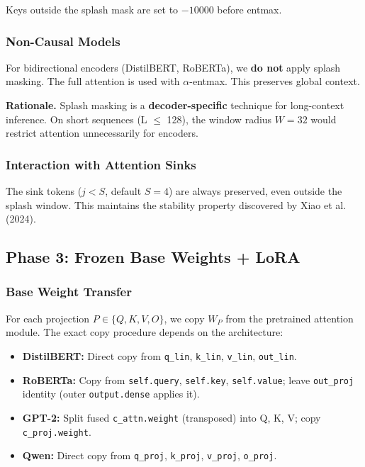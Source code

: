 Keys outside the splash mask are set to $-10000$ before entmax.

\subsubsection{Non-Causal Models}

For bidirectional encoders (DistilBERT, RoBERTa), we \textbf{do not} apply 
splash masking. The full attention is used with $\alpha$-entmax. This preserves 
global context.

\textbf{Rationale.} Splash masking is a \textbf{decoder-specific} technique for 
long-context inference. On short sequences (L $\le$ 128), the window radius 
$W = 32$ would restrict attention unnecessarily for encoders.

\subsubsection{Interaction with Attention Sinks}

The sink tokens ($j < S$, default $S = 4$) are always preserved, even outside 
the splash window. This maintains the stability property discovered by 
Xiao et al. (2024).

\subsection{Phase 3: Frozen Base Weights + LoRA}

\subsubsection{Base Weight Transfer}

For each projection $P \in \{Q, K, V, O\}$, we copy $W_P$ from the pretrained 
attention module. The exact copy procedure depends on the architecture:

\begin{itemize}
\item \textbf{DistilBERT:} Direct copy from \texttt{q\_lin}, \texttt{k\_lin}, \texttt{v\_lin}, \texttt{out\_lin}.
\item \textbf{RoBERTa:} Copy from \texttt{self.query}, \texttt{self.key}, \texttt{self.value}; leave
  \texttt{out\_proj} identity (outer \texttt{output.dense} applies it).
\item \textbf{GPT-2:} Split fused \texttt{c\_attn.weight} (transposed) into Q, K, V; copy
  \texttt{c\_proj.weight}.
\item \textbf{Qwen:} Direct copy from \texttt{q\_proj}, \texttt{k\_proj}, \texttt{v\_proj}, \texttt{o\_proj}.

\end{itemize}
